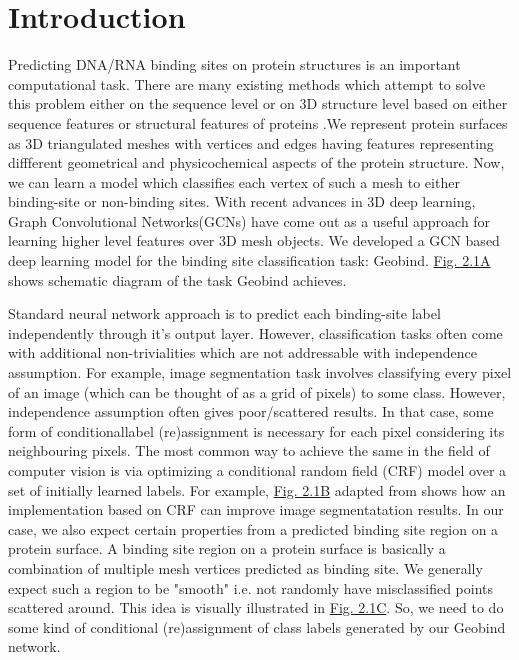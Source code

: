 \section{Introduction} Predicting DNA/RNA binding sites on protein structures is an important
computational task.  There are many existing methods which attempt to solve this problem either on
the sequence level or on 3D structure level based on either sequence features or structural features
of proteins \citep{deng2018pdrlgb, wang2010bindn+, wang2006bindn, li2013predna}
.We  represent protein surfaces as 3D triangulated meshes with 
vertices and edges having features representing diffferent geometrical and physicochemical aspects
of the protein structure. Now, we can learn a model which classifies each vertex of such a mesh to either binding-site or
non-binding sites. With recent advances in 3D deep learning, Graph Convolutional
Networks(GCNs) have come out as a useful approach for learning higher level features over
3D mesh objects. We developed a GCN based deep learning model for the binding site classification
task: Geobind. \hyperref[fig:crf_concept]{Fig. 2.1A} shows schematic diagram of
the task Geobind achieves.

Standard neural network approach is to predict each binding-site label independently
through it's output layer. However, classification tasks often come with additional non-trivialities which
are not addressable with independence assumption.  For example, image segmentation task involves
classifying every pixel of an image (which can be thought of as a grid of pixels) to some class.
However, independence assumption often gives poor/scattered results. In that case, some form of
conditionallabel (re)assignment is necessary for each pixel considering its neighbouring pixels. The
most common way to achieve the same in the field of computer vision is via optimizing a conditional
random  field (CRF) model over a set of initially  learned labels. For example,
\hyperref[fig:crf_concept]{Fig. 2.1B} adapted
from \citet{krahenbuhl2012efficient}  shows how an implementation based on CRF can improve image
segmentatation results. In our case, we also expect certain properties from a predicted binding site
region on a protein surface. A binding site region on a protein surface is basically a combination
of multiple mesh vertices predicted as binding site. We generally expect such a region to be
"smooth" i.e. not randomly have misclassified points scattered around. This idea is visually illustrated in
\hyperref[fig:crf_concept]{Fig. 2.1C}. So, we need to do some kind
of conditional (re)assignment of class labels generated by our Geobind network.

